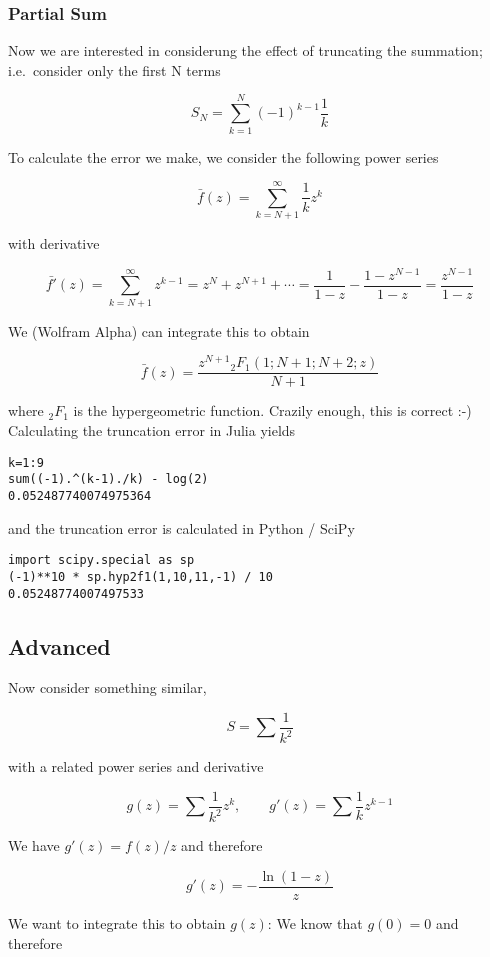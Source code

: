 \subsubsection{Partial Sum}\label{partial-sum}

Now we are interested in considerung the effect of truncating the
summation; i.e.~consider only the first N terms

\[
S_N = \sum_{k=1}^N (-1)^{k-1} \frac{1}{k}
\]

To calculate the error we make, we consider the following power series

\[
\bar{f}(z) = \sum_{k=N+1}^\infty \frac{1}{k}z^k
\]

with derivative

\[
\bar{f'}(z) = \sum_{k=N+1}^\infty z^{k-1} = z^N + z^{N+1} + \cdots = \frac{1}{1-z} - \frac{1-z^{N-1}}{1-z} = \frac{z^{N-1}}{1-z}
\]

We (Wolfram Alpha) can integrate this to obtain

\[
\bar{f}(z) = \frac{z^{N+1} {}_2 F_1(1;N+1;N+2;z)}{N+1}
\]

where \({}_2 F_1\) is the hypergeometric function. Crazily enough, this
is correct :-) Calculating the truncation error in Julia yields

\begin{verbatim}
k=1:9
sum((-1).^(k-1)./k) - log(2)
0.052487740074975364
\end{verbatim}

and the truncation error is calculated in Python / SciPy

\begin{verbatim}
import scipy.special as sp
(-1)**10 * sp.hyp2f1(1,10,11,-1) / 10
0.05248774007497533
\end{verbatim}

\subsection{Advanced}\label{advanced}

Now consider something similar,

\[
S = \sum \frac{1}{k^2}
\]

with a related power series and derivative

\[
g(z) = \sum \frac{1}{k^2}z^k, \qquad g'(z) = \sum \frac{1}{k}z^{k-1}
\]

We have \(g'(z) = f(z) / z\) and therefore

\[
g'(z) = -\frac{\ln(1-z)}{z}
\]

We want to integrate this to obtain \(g(z)\): We know that \(g(0) = 0\)
and therefore

